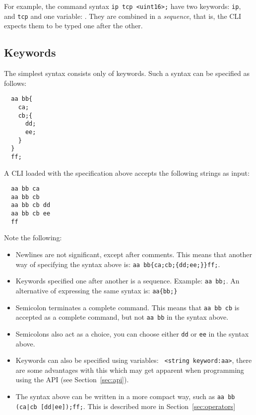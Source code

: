 \documentclass[a4paper, 10pt] {article}
\begin{document}
For example, the command syntax {\tt ip tcp <uint16>;} have two keywords:
{\tt ip}, and {\tt tcp} and one variable: {\tt <uint16>}. They are
combined in a \emph{sequence}, that is, the CLI expects them to be
typed one after the other.

\subsection{Keywords}

The simplest syntax consists only of keywords. Such a syntax can be
specified as follows:
\begin{verbatim}
  aa bb{
    ca;
    cb;{
      dd;
      ee;
    }
  }
  ff;
\end{verbatim}
A CLI loaded with the specification above accepts the following strings as input:
\begin{verbatim}
  aa bb ca
  aa bb cb
  aa bb cb dd
  aa bb cb ee
  ff
\end{verbatim}
Note the following:
\begin{itemize}

\item Newlines are not significant, except after comments. This means
  that another way of specifying the syntax above is: {\tt aa
    bb\{ca;cb;\{dd;ee;\}\}ff;}.

\item Keywords specified one after another is a
  sequence. Example: {\tt aa bb;}. An alternative of expressing the same syntax is: {\tt aa\{bb;\}}

\item Semicolon terminates a complete command. This means that {\tt aa bb cb}
 is accepted as a complete command, but not {\tt aa bb} in the syntax above.

\item Semicolons also act as a choice, you can choose either {\tt dd}
  or {\tt ee} in the syntax above.

\item Keywords can also be specified using variables: {\tt
  <string keyword:aa>}, there are some advantages with this which may
  get apparent when programming using the API (see
  Section~\ref{sec:api}).

\item The syntax above can be written in a more compact way, such as {\tt aa bb (ca|cb [dd|ee]);ff;}. This is described more in Section~\ref{sec:operators}

\end{itemize}
\end{document}
